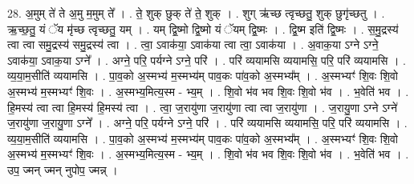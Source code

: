 \documentclass[17pt]{extarticle}
\begin{document}
28. अ॒मुम् ते॑ ते अ॒मु म॒मुम् ते᳚ । . ते॒ शुक् छुक् ते॑ ते॒ शुक् । . शुग् ऋ॑च्छ त्वृच्छतु॒ शुक् छुगृ॑च्छतु । . ऋ॒च्छ॒तु॒ यं ॅय मृ॑च्छ त्वृच्छतु॒ यम् । . यम् द्वि॒ष्मो द्वि॒ष्मो यं ॅयम् द्वि॒ष्मः । . द्वि॒ष्म इति॑ द्वि॒ष्मः । . स॒मु॒द्रस्य॑ त्वा त्वा समु॒द्रस्य॑ समु॒द्रस्य॑ त्वा । . त्वा॒ ऽवाक॑या॒ ऽवाक॑या त्वा त्वा॒ ऽवाक॑या । . अ॒वाक॒या ऽग्ने ऽग्ने॒ ऽवाक॑या॒ ऽवाक॒या ऽग्ने᳚ । . अग्ने॒ परि॒ पर्यग्ने ऽग्ने॒ परि॑ । . परि॑ व्ययामसि व्ययामसि॒ परि॒ परि॑ व्ययामसि । . व्य॒या॒म॒सीति॑ व्ययामसि । . पा॒व॒को अ॒स्मभ्य॑ म॒स्मभ्य॑म् पाव॒कः पा॑व॒को अ॒स्मभ्य᳚म् । . अ॒स्मभ्यꣳ॑ शि॒वः शि॒वो अ॒स्मभ्य॑ म॒स्मभ्यꣳ॑ शि॒वः । . अ॒स्मभ्य॒मित्य॒स्म - भ्य॒म् । . शि॒वो भ॑व भव शि॒वः शि॒वो भ॑व । . भ॒वेति॑ भव । . हि॒मस्य॑ त्वा त्वा हि॒मस्य॑ हि॒मस्य॑ त्वा । . त्वा॒ ज॒रायु॑णा ज॒रायु॑णा त्वा त्वा ज॒रायु॑णा । . ज॒रायु॒णा ऽग्ने ऽग्ने॑ ज॒रायु॑णा ज॒रायु॒णा ऽग्ने᳚ । . अग्ने॒ परि॒ पर्यग्ने ऽग्ने॒ परि॑ । . परि॑ व्ययामसि व्ययामसि॒ परि॒ परि॑ व्ययामसि । . व्य॒या॒म॒सीति॑ व्ययामसि । . पा॒व॒को अ॒स्मभ्य॑ म॒स्मभ्य॑म् पाव॒कः पा॑व॒को अ॒स्मभ्य᳚म् । . अ॒स्मभ्यꣳ॑ शि॒वः शि॒वो अ॒स्मभ्य॑ म॒स्मभ्यꣳ॑ शि॒वः । . अ॒स्मभ्य॒मित्य॒स्म - भ्य॒म् । . शि॒वो भ॑व भव शि॒वः शि॒वो भ॑व । . भ॒वेति॑ भव । . उप॒ ज्मन् ज्मन् नुपोप॒ ज्मन्न् । \newline
\end{document}
